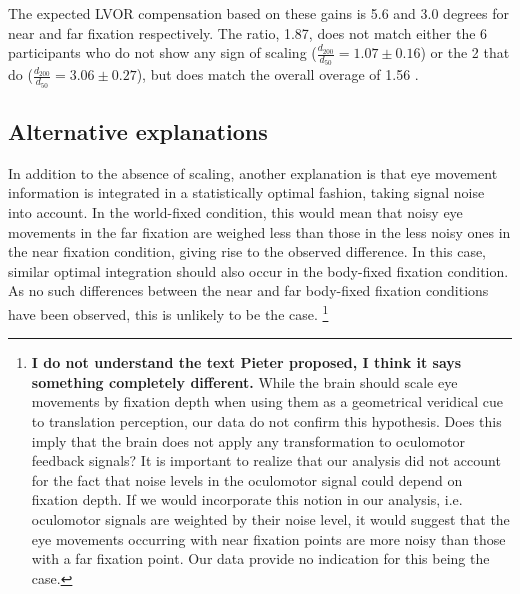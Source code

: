 The expected LVOR compensation based on these gains is 5.6 and 3.0 degrees for near and far fixation respectively. The ratio, 1.87, does not match either the 6 participants who do not show any sign of scaling ($\frac{d_{200}}{d_{50}} = 1.07 \pm 0.16$) or the 2 that do ($\frac{d_{200}}{d_{50}} = 3.06 \pm 0.27$), but does match the overall overage of  1.56 .


%
%






\subsection{Alternative explanations}

In addition to the absence of scaling, another explanation is that eye movement information is integrated in a statistically optimal fashion, taking signal noise into account. In the world-fixed condition, this would mean that noisy eye movements in the far fixation are weighed less than those in the less noisy ones in the near fixation condition, giving rise to the observed difference. In this case, similar optimal integration should also occur in the body-fixed fixation condition. As no such differences between the near and far body-fixed fixation conditions have been observed, this is unlikely to be the case. \footnote{\textbf{I do not understand the text Pieter proposed, I think it says something completely different.} While the brain should scale eye movements by fixation depth when using them as a geometrical veridical cue to translation perception, our data do not confirm this hypothesis. Does this imply that the brain does not apply any transformation to oculomotor feedback signals? It is important to realize that our analysis did not account for the fact that noise levels in the oculomotor signal could depend on fixation depth. If we would incorporate this notion in our analysis, i.e.  oculomotor signals are weighted by their noise level, it would suggest that the eye movements occurring with near fixation points are more noisy than those with a far fixation point. Our data provide no indication for this being the case. }

